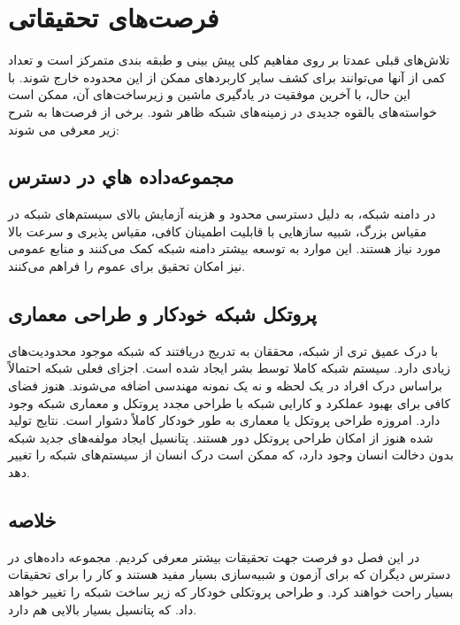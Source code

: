\chapter{فرصت‌های تحقیقاتی}
تلاش‌های قبلی عمدتا بر روی مفاهیم کلی پیش بینی و طبقه بندی متمرکز است و تعداد کمی از آنها می‌توانند برای کشف سایر کاربردهای ممکن از این محدوده خارج شوند. با این حال، با آخرین موفقیت در یادگیری ماشین و زیرساخت‌های آن، ممکن است خواسته‌های بالقوه جدیدی در زمینه‌های شبکه ظاهر شود. برخی از فرصت‌ها به شرح زیر معرفی می شوند\cite{ wang2017machine}:

\section{مجموعه‌داده هاي در دسترس}

در دامنه شبکه، به دلیل دسترسی محدود و هزینه آزمایش بالای سیستم‌های شبکه در مقیاس بزرگ، شبیه سازهایی با قابلیت اطمینان کافی، مقیاس پذیری و سرعت بالا مورد نیاز هستند. این موارد به توسعه بیشتر دامنه شبکه کمک می‌کنند و منابع عمومی نیز امکان تحقیق برای عموم را فراهم می‌کنند.

\section{پروتکل شبکه خودکار و طراحی معماری}
با درک عمیق تری از شبکه، محققان به تدریج دریافتند که شبکه موجود محدودیت‌های زیادی دارد. سیستم شبکه کاملا توسط بشر ایجاد شده است. اجزای فعلی شبکه احتمالاً براساس درک افراد در یک لحظه و نه یک نمونه مهندسی اضافه می‌شوند. هنوز فضای کافی برای بهبود عملکرد و کارایی شبکه با طراحی مجدد پروتکل و معماری شبکه وجود دارد. امروزه طراحی پروتکل یا معماری به طور خودکار کاملاً دشوار است. نتایج تولید شده هنوز از امکان طراحی پروتکل دور هستند. پتانسیل ایجاد مولفه‌های جدید شبکه بدون دخالت انسان وجود دارد، که ممکن است درک انسان از سیستم‌های شبکه را تغییر دهد. 


\section{خلاصه}

در این فصل دو فرصت جهت تحقیقات بیشتر معرفی کردیم. مجموعه داده‌های در دسترس دیگران که برای آزمون و شبیه‌سازی بسیار مفید هستند و کار را برای تحقیقات بسیار راحت خواهند کرد. و طراحی پروتکلی خودکار که زیر ساخت شبکه را تغییر خواهد داد. که پتانسیل بسیار بالایی هم دارد.


\newpage